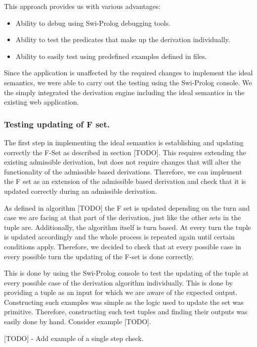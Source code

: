 This approach provides us with various advantages:

\begin{itemize}
\item Ability to debug using Swi-Prolog debugging tools.
\item Ability to test the predicates that make up the derivation individually.
\item Ability to easily test using predefined examples defined in files.
\end{itemize}

Since the application is unaffected by the required changes to implement the ideal semantics, we were able to carry out the testing using the Swi-Prolog console. We the simply integrated the derivation engine including the ideal semantics in the existing web application.

\subsubsection{Testing updating of F set.}
The first step in implementing the ideal semantics is establishing and updating correctly the F-Set as described in section [TODO]. This requires extending the existing admissible derivation, but does not require changes that will alter the functionality of the admissible based derivations. Therefore, we can implement the F set as an extension of the admissible based derivation and check that it is updated correctly during an admissible derivation.

As defined in algorithm [TODO] the F set is updated  depending on the turn and case we are facing at that part of the derivation, just like the other sets in the tuple are. Additionally, the algorithm itself is turn based. At every turn the tuple is updated accordingly and the whole process is repeated again until certain conditions apply. Therefore, we decided to check that at every possible case in every possible turn the updating of the F-set is done correctly.

This is done by using the Swi-Prolog console to test the updating of the tuple at every possible case of the derivation algorithm individually. This is done by providing a tuple as an input for which we are aware of the expected output. Constructing such examples was simple as the logic used to update the  set was primitive. Therefore, constructing such test tuples and finding their outputs was easily done by hand. Consider example [TODO]. 

[TODO] - Add example of a single step check.

